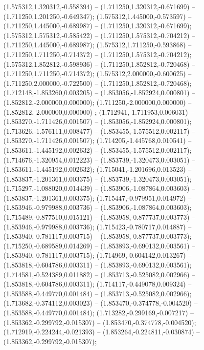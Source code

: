  (1.575312,1.320312,-0.558394) -- (1.711250,1.320312,-0.671699) -- (1.711250,1.201250,-0.649347);
 (1.575312,1.445000,-0.573597) -- (1.711250,1.445000,-0.689987) -- (1.711250,1.320312,-0.671699);
 (1.575312,1.575312,-0.585422) -- (1.711250,1.575312,-0.704212) -- (1.711250,1.445000,-0.689987);
 (1.575312,1.711250,-0.593868) -- (1.711250,1.711250,-0.714372) -- (1.711250,1.575312,-0.704212);
 (1.575312,1.852812,-0.598936) -- (1.711250,1.852812,-0.720468) -- (1.711250,1.711250,-0.714372);
 (1.575312,2.000000,-0.600625) -- (1.711250,2.000000,-0.722500) -- (1.711250,1.852812,-0.720468);
 (1.712148,-1.853260,0.003205) -- (1.853056,-1.852924,0.000801) -- (1.852812,-2.000000,0.000000);
 (1.711250,-2.000000,0.000000) -- (1.852812,-2.000000,0.000000) ;
 (1.712941,-1.711953,0.006031) -- (1.853270,-1.711426,0.001507) -- (1.853056,-1.852924,0.000801);
 (1.713626,-1.576111,0.008477) -- (1.853455,-1.575512,0.002117) -- (1.853270,-1.711426,0.001507);
 (1.714205,-1.445768,0.010541) -- (1.853611,-1.445192,0.002632) -- (1.853455,-1.575512,0.002117);
 (1.714676,-1.320954,0.012223) -- (1.853739,-1.320473,0.003051) -- (1.853611,-1.445192,0.002632);
 (1.715041,-1.201696,0.013523) -- (1.853837,-1.201361,0.003375) -- (1.853739,-1.320473,0.003051);
 (1.715297,-1.088020,0.014439) -- (1.853906,-1.087864,0.003603) -- (1.853837,-1.201361,0.003375);
 (1.715447,-0.979951,0.014972) -- (1.853946,-0.979988,0.003736) -- (1.853906,-1.087864,0.003603);
 (1.715489,-0.877510,0.015121) -- (1.853958,-0.877737,0.003773) -- (1.853946,-0.979988,0.003736);
 (1.715423,-0.780717,0.014887) -- (1.853940,-0.781117,0.003715) -- (1.853958,-0.877737,0.003773);
 (1.715250,-0.689589,0.014269) -- (1.853893,-0.690132,0.003561) -- (1.853940,-0.781117,0.003715);
 (1.714969,-0.604142,0.013267) -- (1.853818,-0.604786,0.003311) -- (1.853893,-0.690132,0.003561);
 (1.714581,-0.524389,0.011882) -- (1.853713,-0.525082,0.002966) -- (1.853818,-0.604786,0.003311);
 (1.714117,-0.449078,0.009324) -- (1.853588,-0.449770,0.001484) -- (1.853713,-0.525082,0.002966);
 (1.713682,-0.374112,0.003023) -- (1.853470,-0.374778,-0.004520) -- (1.853588,-0.449770,0.001484);
 (1.713282,-0.299169,-0.007217) -- (1.853362,-0.299792,-0.015307) -- (1.853470,-0.374778,-0.004520);
 (1.712919,-0.224244,-0.021393) -- (1.853264,-0.224811,-0.030874) -- (1.853362,-0.299792,-0.015307);
